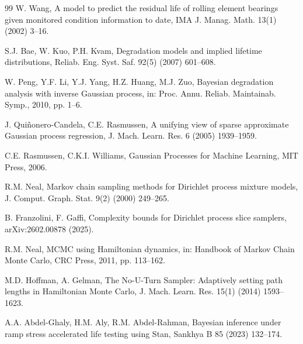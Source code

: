 \documentclass[a4paper,fleqn,longmktitle]{cas-sc}
\begin{document}
\begin{thebibliography}{99}
W. Wang, A model to predict the residual life of rolling element bearings given monitored condition information to date, IMA J. Manag. Math. 13(1) (2002) 3--16.





S.J. Bae, W. Kuo, P.H. Kvam, Degradation models and implied lifetime distributions, Reliab. Eng. Syst. Saf. 92(5) (2007) 601--608.





W. Peng, Y.F. Li, Y.J. Yang, H.Z. Huang, M.J. Zuo, Bayesian degradation analysis with inverse Gaussian process, in: Proc. Annu. Reliab. Maintainab. Symp., 2010, pp. 1--6.





J. Qui\~{n}onero-Candela, C.E. Rasmussen, A unifying view of sparse approximate Gaussian process regression, J. Mach. Learn. Res. 6 (2005) 1939--1959.





C.E. Rasmussen, C.K.I. Williams, Gaussian Processes for Machine Learning, MIT Press, 2006.





R.M. Neal, Markov chain sampling methods for Dirichlet process mixture models, J. Comput. Graph. Stat. 9(2) (2000) 249--265.





B. Franzolini, F. Gaffi, Complexity bounds for Dirichlet process slice samplers, arXiv:2602.00878 (2025).





R.M. Neal, MCMC using Hamiltonian dynamics, in: Handbook of Markov Chain Monte Carlo, CRC Press, 2011, pp. 113--162.





M.D. Hoffman, A. Gelman, The No-U-Turn Sampler: Adaptively setting path lengths in Hamiltonian Monte Carlo, J. Mach. Learn. Res. 15(1) (2014) 1593--1623.





A.A. Abdel-Ghaly, H.M. Aly, R.M. Abdel-Rahman, Bayesian inference under ramp stress accelerated life testing using Stan, Sankhya B 85 (2023) 132--174.






\end{thebibliography}
\end{document}
